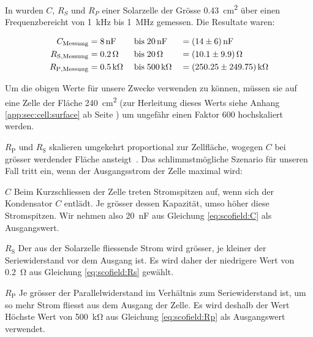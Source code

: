 In \cite{ref:solar:scofield} wurden $C$,  $R_{S}$ und $R_{P}$ einer Solarzelle
der Gr\"osse \SI{0.43}{\centi\meter\squared} \"uber einen Frequenzbereicht von
\SI{1}{\kilo\hertz} bis \SI{1}{\mega\hertz} gemessen. Die Resultate waren:

\begin{alignat}{3}
    \label{eq:scofield:C}
    C_{\mathrm{Messung}}    &= \SI{8}{\nano\farad} \; & \text{bis} \; & \SI{20}{\nano\farad} \;  & = & \; \SI{14 \pm 6}{\nano\farad} \\
    \label{eq:scofield:Rs}
    R_{\mathrm{S, Messung}} &= \SI{0.2}{\ohm}      \; & \text{bis} \; & \SI{20}{\ohm}        \;  & = & \; \SI{10.1 \pm 9.9}{\ohm}     \\
    \label{eq:scofield:Rp}
    R_{\mathrm{P, Messung}} &= \SI{0.5}{\kilo\ohm} \; & \text{bis} \; & \SI{500}{\kilo\ohm}  \;  & = & \; \SI{250.25 \pm 249.75}{\kilo\ohm}
\end{alignat}

Um   die   obigen  Werte   f\"ur   unsere   Zwecke  verwenden   zu   k\"onnen,
m\"ussen  sie  auf  eine  Zelle  der  Fl\"ache  \SI{240}{\centi\meter\squared}
(zur  Herleitung  dieses  Werts  siehe  Anhang  \ref{app:sec:cell:surface}  ab
Seite  \pageref{app:sec:cell:surface}) um  ungef\"ahr  einen Faktor  \num{600}
hochskaliert werden.

$R_{\mathrm{P}}$   und  $R_{\mathrm{S}}$   skalieren  umgekehrt   proportional
zur   Zellfl\"ache,    wogegen   $C$   bei   gr\"osser    werdender   Fl\"ache
ansteigt~\cite{ref:solar:scofield}. Das  schlimmstm\"ogliche   Szenario  f\"ur
unseren   Fall  tritt   ein,  wenn   der  Ausgangsstrom   der  Zelle   maximal
wird:

\begin{symbols}
    \firmlist
    \item[$C$]
        Beim Kurzschliessen der  Zelle treten Stromspitzen auf,  wenn sich der
        Kondensator  $C$  entl\"adt. Je  gr\"osser  dessen  Kapazit\"at,  umso
        h\"oher diese Stromspitzen.  Wir  nehmen also \SI{20}{\nano\farad} aus
        Gleichung \ref{eq:scofield:C} als Ausgangswert.
    \item[$R_{\mathrm{S}}$]
        Der aus der Solarzelle fliessende Strom wird gr\"osser, je kleiner der
        Seriewiderstand vor dem Ausgang ist. Es wird daher der niedrigere Wert
        von \SI{0.2}{\ohm} aus Gleichung \ref{eq:scofield:Rs} gew\"ahlt.
    \item[$R_{\mathrm{P}}$]
        Je    gr\"osser   der    Parallelwiderstand   im    Verh\"altnis   zum
        Seriewiderstand   ist,   um   so    mehr   Strom   fliesst   aus   dem
        Ausgang  der  Zelle.    Es  wird  deshalb  der   Wert  H\"ochste  Wert
        von   \SI{500}{\kilo\ohm}  aus   Gleichung  \ref{eq:scofield:Rp}   als
        Ausgangswert verwendet.
\end{symbols}

